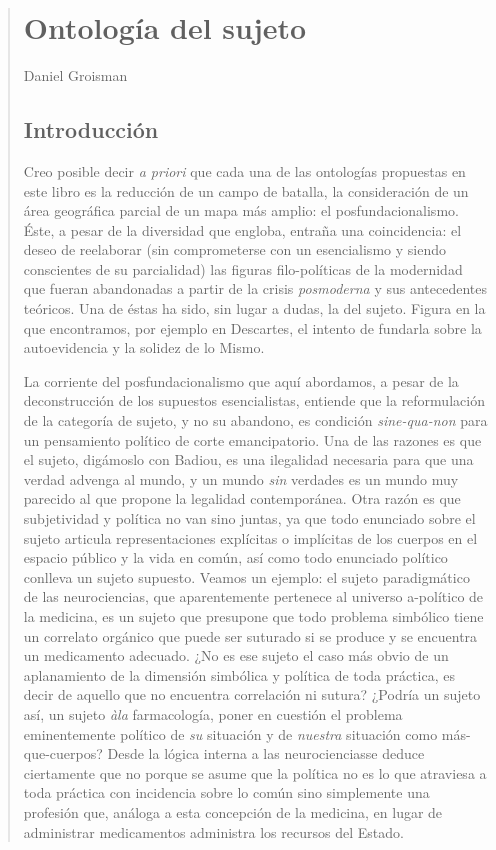 \begin{quote}
\chapter{Ontología del sujeto}

Daniel Groisman

\section{Introducción}

Creo posible decir \emph{a priori} que cada una de las ontologías propuestas en este libro es la reducción de un campo de batalla, la consideración de un área geográfica parcial de un mapa más amplio: el posfundacionalismo. Éste, a pesar de la diversidad que engloba, entraña una coincidencia: el deseo de reelaborar (sin comprometerse con un esencialismo y siendo conscientes de su parcialidad) las figuras filo-políticas de la modernidad que fueran abandonadas a partir de la crisis \emph{posmoderna} y sus antecedentes teóricos. Una de éstas ha sido, sin lugar a dudas, la del sujeto. Figura en la que encontramos, por ejemplo en Descartes, el intento de fundarla sobre la autoevidencia y la solidez de lo Mismo.

La corriente del posfundacionalismo que aquí abordamos, a pesar de la deconstrucción de los supuestos esencialistas, entiende que la reformulación de la categoría de sujeto, y no su abandono, es condición \emph{sine-qua-non} para un pensamiento político de corte emancipatorio. Una de las razones es que el sujeto, digámoslo con Badiou, es una ilegalidad necesaria para que una verdad advenga al mundo, y un mundo \emph{sin} verdades es un mundo muy parecido al que propone la legalidad contemporánea. Otra razón es que subjetividad y política no van sino juntas, ya que todo enunciado sobre el sujeto articula representaciones explícitas o implícitas de los cuerpos en el espacio público y la vida en común, así como todo enunciado político conlleva un sujeto supuesto. Veamos un ejemplo: el sujeto paradigmático de las neurociencias, que aparentemente pertenece al universo a-político de la medicina, es un sujeto que presupone que todo problema simbólico tiene un correlato orgánico que puede ser suturado si se produce y se encuentra un medicamento adecuado. ¿No es ese sujeto el caso más obvio de un aplanamiento de la dimensión simbólica y política de toda práctica, es decir de aquello que no encuentra correlación ni sutura? ¿Podría un sujeto así, un sujeto \emph{àla} farmacología, poner en cuestión el problema eminentemente político de \emph{su} situación y de \emph{nuestra} situación como más-que-cuerpos? Desde la lógica interna a las neurocienciasse deduce ciertamente que no porque se asume que la política no es lo que atraviesa a toda práctica con incidencia sobre lo común sino simplemente una profesión que, análoga a esta concepción de la medicina, en lugar de administrar medicamentos administra los recursos del Estado.


\end{quote}
